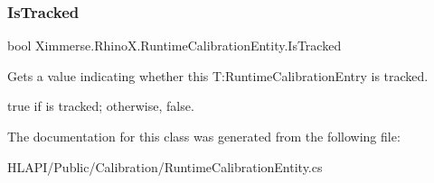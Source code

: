 \subsubsection{\texorpdfstring{Is\+Tracked}{IsTracked}}
{\footnotesize\ttfamily bool Ximmerse.\+Rhino\+X.\+Runtime\+Calibration\+Entity.\+Is\+Tracked\hspace{0.3cm}{\ttfamily [get]}}



Gets a value indicating whether this T\+:\+Runtime\+Calibration\+Entry is tracked. 

{\ttfamily true} if is tracked; otherwise, {\ttfamily false}.

The documentation for this class was generated from the following file\+:\begin{DoxyCompactItemize}
\item 
H\+L\+A\+P\+I/\+Public/\+Calibration/Runtime\+Calibration\+Entity.\+cs\end{DoxyCompactItemize}

